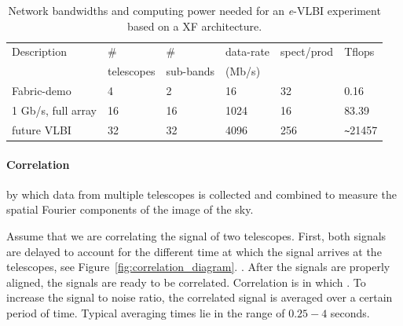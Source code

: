 \begin{table}
  \centering
  \begin{tabular}[c]{|l|l|l|l|l|l|}
    \hline
    Description & \# & \#  & data-rate & spect/prod & Tflops\\
    & telescopes & sub-bands & (Mb/s) &  & \\
    \hline
    \hline
    Fabric-demo &4 &2 &16 &32 &0.16\\
    1 Gb/s, full array  &16 &16 &1024 &16 &83.39\\
    future VLBI &32 &32 &4096 &256 &\verb|~|21457\\
    \hline
  \end{tabular}
  \caption{Network bandwidths and computing power needed for an {\it e}-VLBI
    experiment based on a XF architecture.}
  \label{tab:speed}
\end{table}

\paragraph{Correlation}
 by which data from multiple telescopes is
collected and combined to measure the spatial Fourier components of
the image of the sky. 

Assume that we are correlating the signal of two telescopes. First,
both signals are delayed to account for the different time at which
the signal arrives at the telescopes, see
Figure~\ref{fig:correlation_diagram}. . After  the signals are properly aligned, the signals are ready to be correlated. Correlation is in
which . To increase the signal to noise ratio, the correlated signal
is averaged over a certain period of time. Typical averaging times lie
in the range of $0.25-4$ seconds.

